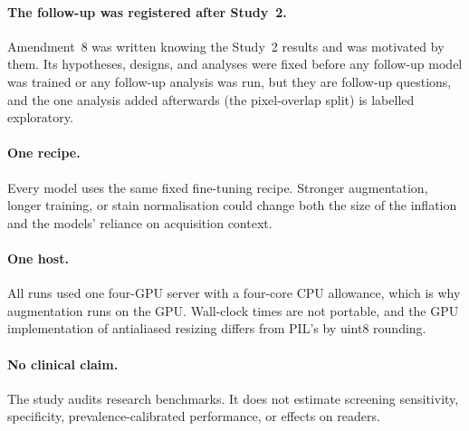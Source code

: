 \paragraph{The follow-up was registered after Study~2.} Amendment~8 was written knowing the
Study~2 results and was motivated by them. Its hypotheses, designs, and analyses were fixed
before any follow-up model was trained or any follow-up analysis was run, but they are follow-up
questions, and the one analysis added afterwards (the pixel-overlap split) is labelled
exploratory.

\paragraph{One recipe.} Every model uses the same fixed fine-tuning recipe. Stronger
augmentation, longer training, or stain normalisation could change both the size of
the inflation and the models' reliance on acquisition context.

\paragraph{One host.} All runs used one four-GPU server with a four-core CPU allowance,
which is why augmentation runs on the GPU. Wall-clock times are not portable, and the
GPU implementation of antialiased resizing differs from PIL's by uint8 rounding.

\paragraph{No clinical claim.} The study audits research benchmarks. It does not
estimate screening sensitivity, specificity, prevalence-calibrated performance, or
effects on readers.
